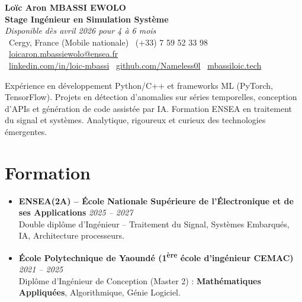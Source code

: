 \documentclass[a4paper,11pt]{article}
\begin{document}
\begin{center}
    {\Large \textbf{Loïc Aron MBASSI EWOLO}} \\ \vspace{4pt}
    \textbf{\large Stage Ingénieur en Simulation Système} \\
    \textit{\small Disponible dès avril 2026 pour 4 à 6 mois} \\ \vspace{4pt}
    \small
    \faMapMarker\ Cergy, France (Mobile nationale) \quad
    \faPhone\ (+33) 7 59 52 33 98 \quad
    {\color{primary}\faEnvelope\ \href{mailto:loicaron.mbassiewolo@ensea.fr}{loicaron.mbassiewolo@ensea.fr}} \\ \vspace{2pt}
    {\color{primary}\faLinkedin\ \href{https://www.linkedin.com/in/loic-mbassi/}{linkedin.com/in/loic-mbassi}} \quad
    {\color{primary}\faGithub\ \href{https://github.com/Nameless0l}{github.com/Nameless0l}} \quad
    {\color{primary}\faGlobe\ \href{https://mbassiloic.tech}{mbassiloic.tech}}
\end{center}

\vspace{-6pt}

\noindent\small{Expérience en développement Python/C++ et frameworks ML (PyTorch, TensorFlow). Projets en détection d'anomalies sur séries temporelles, conception d'APIs et génération de code assistée par IA. Formation ENSEA en traitement du signal et systèmes. Analytique, rigoureux et curieux des technologies émergentes.}

\section{Formation}
\begin{itemize}[leftmargin=*, label=\tiny$\bullet$, nosep]
    \item \textbf{ENSEA(2A) -- École Nationale Supérieure de l'Électronique et de ses Applications} \hfill \textit{2025 -- 2027} \\
    \small{Double diplôme d'Ingénieur -- Traitement du Signal, Systèmes Embarqués, IA, Architecture processeurs.}
    \item \textbf{École Polytechnique de Yaoundé (1\textsuperscript{ère} école d'ingénieur CEMAC)} \hfill \textit{2021 -- 2025} \\
    \small{Diplôme d'Ingénieur de Conception (Master 2) : \textbf{Mathématiques Appliquées}, Algorithmique, Génie Logiciel.}
\end{itemize}
\end{document}
